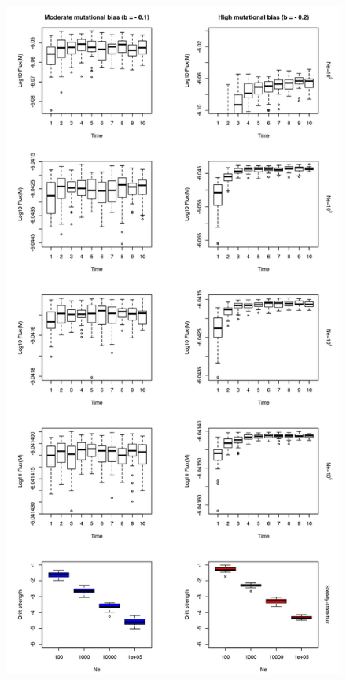 \begin{figure}[H]
\vspace{-0.5cm}
\begin{center}
\includegraphics[scale=0.5,trim=0cm 0cm 0cm 0cm,clip]{pics/SM-Enzymes/Evo_SteadyState_HighMutCorr_LowF.jpeg} 

\end{center}
\end{figure}
